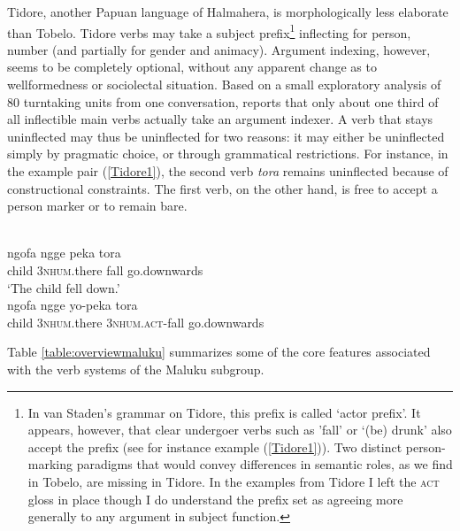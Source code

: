 Tidore, another Papuan language of Halmahera, is morphologically less elaborate than Tobelo. Tidore verbs may take a subject prefix\footnote{In van Staden's grammar on Tidore, this prefix is called `actor prefix'. It appears, however, that clear undergoer verbs such as 'fall' or `(be) drunk' also accept the prefix (see for instance example (\ref{Tidore1})). Two distinct person-marking paradigms that would convey differences in semantic roles, as we find in Tobelo, are missing in Tidore. In the examples from Tidore I left the \textsc{act} gloss in place though I do understand the prefix set as agreeing more generally to any argument in subject function.} inflecting for person, number (and partially for gender and animacy). Argument indexing, however, seems to be completely optional, without any apparent change as to wellformedness or sociolectal situation. Based on a small exploratory analysis of 80 turntaking units from one conversation, \citet[79]{vanstaden2000tidore} reports that only about one third of all inflectible main verbs actually take an argument indexer. A verb that stays uninflected may thus be uninflected for two reasons: it may either be uninflected simply by pragmatic choice, or through grammatical restrictions. For instance, in the example pair (\ref{Tidore1}), the second verb \textit{tora} remains uninflected because of constructional constraints. The first verb, on the other hand, is free to accept a person marker or to remain bare.

\ea \label{Tidore1}
\\
\ea
\gll ngofa ngge peka tora \\
child 3\textsc{nhum}.there fall go.downwards \\
\glft `The child fell down.’ \\ 
\ex
\gll ngofa ngge yo-peka tora \\ 
child 3\textsc{nhum}.there 3\textsc{nhum}.\textsc{act}-fall go.downwards \\
\glft   
\z
\z

Table \ref{table:overviewmaluku} summarizes some of the core features associated with the verb systems of the Maluku subgroup.

\begin{table}[h]
\caption[Basic features of Maluku verb systems]{Overview of basic verbal features of the Maluku languages in the EI data set. Constituent order lists only the basic pattern, pragmatically induced alternative patterns are often also available. Brackets indicate optional use of argument indexers.}
\label{table:overviewmaluku}
\end{table}

